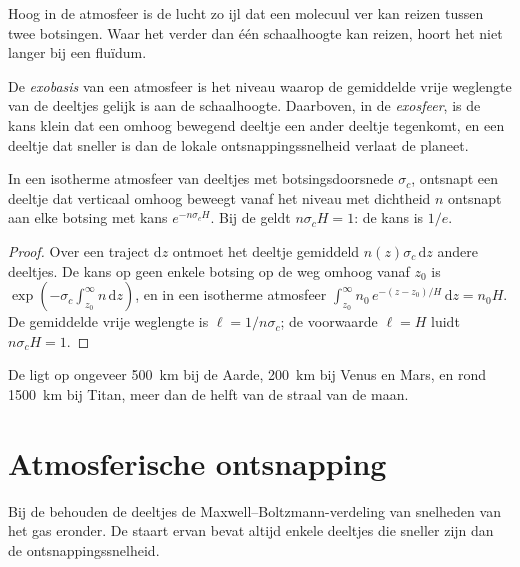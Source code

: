 Hoog in de atmosfeer is de lucht zo ijl dat een molecuul ver kan reizen
tussen twee botsingen. Waar het verder dan één schaalhoogte kan reizen, hoort het
niet langer bij een fluïdum.

\begin{definition}\label{def:b3:planetary-atmospheres:exobase}
De \emph{exobasis} van een atmosfeer is het niveau waarop
de gemiddelde vrije weglengte van de deeltjes gelijk is aan de schaalhoogte. Daarboven,
in de \emph{exosfeer}, is de kans klein dat een omhoog bewegend deeltje
een ander deeltje tegenkomt, en een deeltje dat sneller is dan de lokale ontsnappingssnelheid
verlaat de planeet.
\end{definition}

\begin{proposition}\label{prop:b3:planetary-atmospheres:exobase}
In een isotherme atmosfeer van deeltjes met botsingsdoorsnede
$\sigma_c$, ontsnapt een deeltje dat verticaal omhoog beweegt vanaf het niveau met dichtheid
$n$ ontsnapt aan elke botsing met kans $e^{-n\sigma_c H}$. Bij de
 geldt $n\sigma_c H = 1$: de kans is $1/e$.
\end{proposition}

\begin{proof}
Over een traject $\mathrm dz$ ontmoet het deeltje gemiddeld $n(z)\sigma_c\,
\mathrm dz$ andere deeltjes. De kans op geen enkele botsing op de weg omhoog
vanaf $z_0$ is $\exp(-\sigma_c\int_{z_0}^\infty n\,\mathrm dz)$, en in een
isotherme atmosfeer $\int_{z_0}^\infty n_0\,e^{-(z-z_0)/H}\,\mathrm dz
= n_0 H$. De gemiddelde vrije weglengte is $\ell = 1/n\sigma_c$; de voorwaarde $\ell
= H$ luidt $n\sigma_c H = 1$.
\end{proof}

De  ligt op ongeveer \qty{500}{km} bij de Aarde, \qty{200}{km} bij
Venus en Mars, en rond \qty{1500}{km} bij Titan, meer dan de helft van de
straal van de maan.

\section{Atmosferische ontsnapping}\label{sec:b3:planetary-atmospheres:escape}

Bij de  behouden de deeltjes de Maxwell--Boltzmann-verdeling van
snelheden van het gas eronder. De staart ervan bevat altijd enkele deeltjes die sneller zijn dan
de ontsnappingssnelheid.

